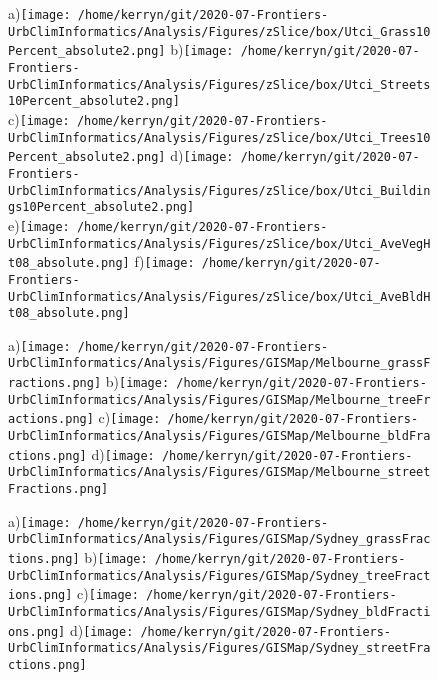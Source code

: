 \documentclass{article}
\begin{document}
\begin{figure} %
\centering    
{\tiny a)}\texttt{[image: /home/kerryn/git/2020-07-Frontiers-UrbClimInformatics/Analysis/Figures/zSlice/box/Utci\_Grass10Percent\_absolute2.png]}
{\tiny b)}\texttt{[image: /home/kerryn/git/2020-07-Frontiers-UrbClimInformatics/Analysis/Figures/zSlice/box/Utci\_Streets10Percent\_absolute2.png]}\\
{\tiny c)}\texttt{[image: /home/kerryn/git/2020-07-Frontiers-UrbClimInformatics/Analysis/Figures/zSlice/box/Utci\_Trees10Percent\_absolute2.png]}
{\tiny d)}\texttt{[image: /home/kerryn/git/2020-07-Frontiers-UrbClimInformatics/Analysis/Figures/zSlice/box/Utci\_Buildings10Percent\_absolute2.png]}\\
{\tiny e)}\texttt{[image: /home/kerryn/git/2020-07-Frontiers-UrbClimInformatics/Analysis/Figures/zSlice/box/Utci\_AveVegHt08\_absolute.png]}
{\tiny f)}\texttt{[image: /home/kerryn/git/2020-07-Frontiers-UrbClimInformatics/Analysis/Figures/zSlice/box/Utci\_AveBldHt08\_absolute.png]}
\end{figure} 
\clearpage




\begin{figure} %
\centering    
{\tiny a)}\texttt{[image: /home/kerryn/git/2020-07-Frontiers-UrbClimInformatics/Analysis/Figures/GISMap/Melbourne\_grassFractions.png]}
{\tiny b)}\texttt{[image: /home/kerryn/git/2020-07-Frontiers-UrbClimInformatics/Analysis/Figures/GISMap/Melbourne\_treeFractions.png]}
{\tiny c)}\texttt{[image: /home/kerryn/git/2020-07-Frontiers-UrbClimInformatics/Analysis/Figures/GISMap/Melbourne\_bldFractions.png]}
{\tiny d)}\texttt{[image: /home/kerryn/git/2020-07-Frontiers-UrbClimInformatics/Analysis/Figures/GISMap/Melbourne\_streetFractions.png]}
\end{figure} 
\clearpage


\begin{figure} %
\centering    
{\tiny a)}\texttt{[image: /home/kerryn/git/2020-07-Frontiers-UrbClimInformatics/Analysis/Figures/GISMap/Sydney\_grassFractions.png]}
{\tiny b)}\texttt{[image: /home/kerryn/git/2020-07-Frontiers-UrbClimInformatics/Analysis/Figures/GISMap/Sydney\_treeFractions.png]}
{\tiny c)}\texttt{[image: /home/kerryn/git/2020-07-Frontiers-UrbClimInformatics/Analysis/Figures/GISMap/Sydney\_bldFractions.png]}
{\tiny d)}\texttt{[image: /home/kerryn/git/2020-07-Frontiers-UrbClimInformatics/Analysis/Figures/GISMap/Sydney\_streetFractions.png]}
\end{figure} 
\clearpage
\end{document}
